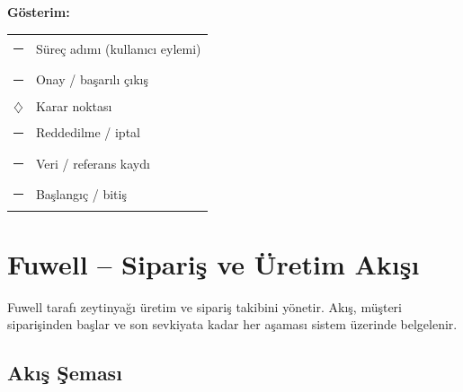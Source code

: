 \documentclass[11pt,a4paper]{article}
\begin{document}
\vspace{0.6cm}
\noindent\textbf{Gösterim:}
\begin{tabularx}{\textwidth}{lX}
\textcolor{accent}{\rule{0.6cm}{0.25cm}} & Süreç adımı (kullanıcı eylemi) \\
\textcolor{accent2}{\rule{0.6cm}{0.25cm}} & Onay / başarılı çıkış \\
\textcolor{warn}{$\diamondsuit$} & Karar noktası \\
\textcolor{danger}{\rule{0.6cm}{0.25cm}} & Reddedilme / iptal \\
\textcolor{purple}{\rule{0.6cm}{0.25cm}} & Veri / referans kaydı \\
\textcolor{slate}{\rule{0.6cm}{0.25cm}} & Başlangıç / bitiş \\
\end{tabularx}

\newpage

\section{Fuwell -- Sipariş ve Üretim Akışı}

Fuwell tarafı zeytinyağı üretim ve sipariş takibini yönetir. Akış, müşteri
siparişinden başlar ve son sevkiyata kadar her aşaması sistem üzerinde
belgelenir.

\subsection{Akış Şeması}
\end{document}

